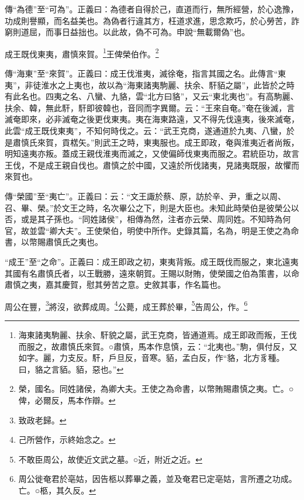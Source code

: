{\noindent\shu{}\fzkt 傳“為德”至“可為”。正義曰：為德者自得於己，直道而行，無所經營，於心逸豫，功成則譽顯，而名益美也。為偽者行違其方，枉道求進，思念欺巧，於心勞苦，詐窮則道屈，而事日益拙也。以此故，偽不可為。申說“無載爾偽”也。 \par}

成王既伐東夷，肅慎來賀。\footnote{海東諸夷駒麗、扶余、馯貌之屬，武王克商，皆通道焉。成王即政而叛，王伐而服之，故肅慎氏來賀。○肅慎，馬本作息慎，云：“北夷也。”駒，俱付反，又如字。麗，力支反。馯，戶旦反，音寒。貊，孟白反，作“貉，北方豸種。曰，貉之言貊。貊，惡也。”}王俾榮伯作。\footnote{榮，國名。同姓諸侯，為卿大夫。王使之為命書，以幣賄賜肅慎之夷。亡。○俾，必爾反，馬本作辯。}


{\noindent\zhuan{}\fzbyks 傳“海東”至“來賀”。正義曰：成王伐淮夷，滅徐奄，指言其國之名。此傳言“東夷”，非徒淮水之上夷也，故以為“海東諸夷駒麗、扶余、馯貊之屬”，此皆於之時有此名也。四夷之名、八蠻、九貉，雲“北方曰貉”，又云“東北夷也”。有高駒麗、扶余、韓，無此馯，馯即彼韓也，音同而字異爾。云：“王來自奄。”奄在後滅，言滅奄即來，必非滅奄之後更伐東夷。夷在海東路遠，又不得先伐遠夷，後來滅奄，此雲“成王既伐東夷”，不知何時伐之。云：“武王克商，遂通道於九夷、八蠻，於是肅慎氏來賀，貢楛矢。”則武王之時，東夷服也。成王即政，奄與淮夷近者尚叛，明知遠夷亦叛。蓋成王親伐淮夷而滅之，又使偏師伐東夷而服之。君統臣功，故言王伐，不是成王親自伐也。肅慎之於中國，又遠於所伐諸夷，見諸夷既服，故懼而來賀也。 \par}

{\noindent\zhuan{}\fzbyks 傳“榮國”至“夷亡”。正義曰：云：“文王諏於蔡、原，訪於辛、尹，重之以周、召、畢、榮。”於文王之時，名次畢公之下，則是大臣也。未知此時榮伯是彼榮公以否，或是其子孫也。“同姓諸侯”，相傳為然，注者亦云榮、周同姓。不知時為何官，故並雲“卿大夫”。王使榮伯，明使中所作。史錄其篇，名為，明是王使之為命書，以幣賜肅慎氏之夷也。 \par}

{\noindent\shu{}\fzkt “成王”至“之命”。正義曰：成王即政之初，東夷背叛。成王既伐而服之，東北遠夷其國有名肅慎氏者，以王戰勝，遠來朝賀。王賜以財賄，使榮國之伯為策書，以命肅慎之夷，嘉其慶賀，慰其勞苦之意。史敘其事，作名篇也。 \par}

周公在豐，\footnote{致政老歸。}將沒，欲葬成周。\footnote{己所營作，示終始念之。}公薨，成王葬於畢，\footnote{不敢臣周公，故使近文武之墓。○近，附近之近。}告周公，作。\footnote{周公徙奄君於亳姑，因告柩以葬畢之義，並及奄君已定亳姑，言所遷之功成。亡。○柩，其久反。}


